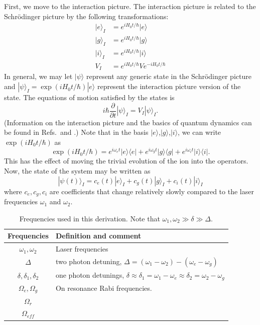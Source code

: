 First, we move to the interaction picture. The interaction picture is related to the Schr\"odinger picture by the following transformations: 
\begin{align}
\label{intTransforms}
|e\rangle_I&=e^{iH_0t/\hbar}|e\rangle\\
|g\rangle_I&=e^{iH_0t/\hbar}|g\rangle\\
|i\rangle_I&=e^{iH_0t/\hbar}|i\rangle\\
V_I&=e^{iH_0t/\hbar}Ve^{-iH_0t/\hbar}
\end{align}
In general, we may let $|\psi\rangle$ represent any generic state in the Schr\"odinger picture and $|\psi\rangle_I=\exp(iH_0t/\hbar)|e\rangle$ represent the interaction picture version of the state. The equations of motion satisfied by the states is 
\begin{equation}
i\hbar \frac{\partial}{\partial t}|\psi\rangle_I= V_I|\psi\rangle_I.
\end{equation}
(Information on the interaction picture and the basics of quantum dynamics can be found in Refs.\,\cite{sakurai} and \cite{merzbacher}.) Note that in the basis $|e\rangle$,$|g\rangle$,$|i\rangle$, we can write $\exp(iH_0t/\hbar)$ as 
\begin{equation}
\label{expH0}
\exp(iH_0t/\hbar)=e^{i\omega_e t}|e\rangle\langle e|+e^{i\omega_g t}|g\rangle \langle g|+e^{i\omega_i t}|i\rangle\langle i|.
\end{equation}
This has the effect of moving the trivial evolution of the ion into the operators. Now, the state of the system may be written as  
\begin{equation}
|\psi(t)\rangle_I = c_e(t)|e\rangle_I+c_g(t)|g\rangle_I+c_i(t)|i\rangle_I
\end{equation}
where $c_e,c_g,c_i$ are coefficients that change relatively slowly compared to the laser frequencies $\omega_1$ and $\omega_2$.

\begin{table}[h!]
\centering
\begin{tabular}{|c|l|}
\hline
Frequencies & Definition and comment \\ \hline \hline
$\omega_1,\omega_2$& Laser frequencies\\ \hline
$\Delta$ & two photon detuning, $\Delta=(\omega_1-\omega_2)-(\omega_e-\omega_g)$\\ \hline
$\delta,\delta_1,\delta_2$& one photon detunings, $\delta\approx\delta_1=\omega_1-\omega_e\approx
\delta_2=\omega_2-\omega_g$\\ \hline
$\Omega_{e},\Omega_{g}$ & On resonance Rabi frequencies. \\ \hline
$\Omega_{r}$ & \\ \hline
$\Omega_{\mathit{eff}}$ & \\ \hline
\end{tabular}
\caption{Frequencies used in this derivation. Note that $\omega_1,\omega_2\gg \delta \gg \Delta$. }
\label{frequencyTable}
\end{table}

